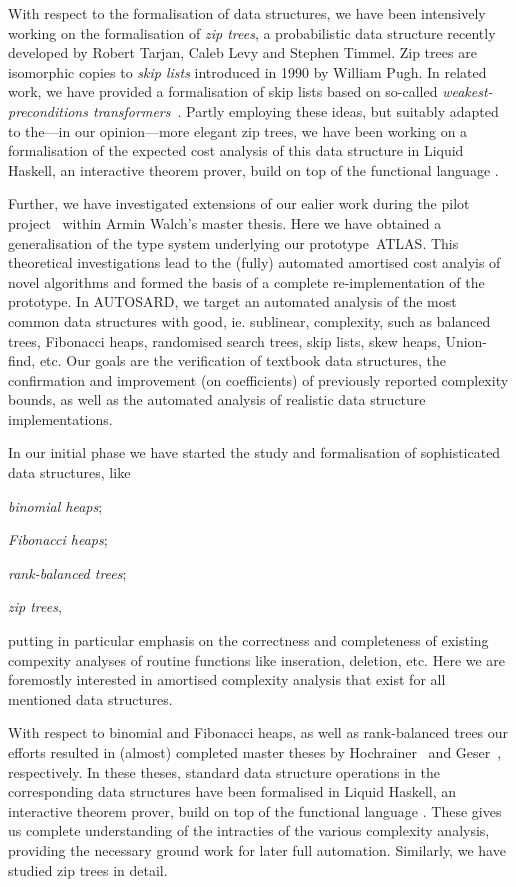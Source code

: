 \documentclass[10pt,a4paper]{article}
\newcommand*{\atlas}{\textsf{ATLAS}}
\begin{document}
With respect to the formalisation of data structures, we have been intensively working
on the formalisation of \emph{zip trees}, a probabilistic data structure recently developed
by Robert Tarjan, Caleb Levy and Stephen Timmel. Zip trees are isomorphic copies to
\emph{skip lists} introduced in 1990 by William Pugh.
%
In related work, we have provided a formalisation of skip lists based on so-called \emph{weakest-preconditions transformers}~\cite{AvanziniBGMV24}. Partly employing these ideas, but suitably adapted
to the---in our opinion---more elegant zip trees, we have been working on
a formalisation of the expected cost analysis of this data structure in Liquid Haskell, an interactive theorem prover, build on top of the functional
language \Haskell.

Further, we have investigated extensions of our ealier work during the pilot project~\cite{LMZ:2021,LMZ:2022} within Armin Walch's master thesis. Here we have obtained a generalisation of the type system
underlying our prototype~\atlas. This theoretical investigations lead to the (fully) automated amortised
cost analyis of novel algorithms and formed the basis of a complete re-implementation of the prototype. 
In AUTOSARD, we target an automated analysis of the most common data structures with good, ie. sublinear, complexity, such as balanced trees, Fibonacci heaps, randomised search trees, skip lists, skew heaps, Union-find, etc. Our goals are the verification of textbook data structures, the confirmation and improvement (on coefficients) of previously reported complexity bounds, as well as the automated analysis of realistic data structure implementations.

In our initial phase we have started the study and formalisation of sophisticated data structures, like
%
\begin{inparaenum}[(i)]
\item \emph{binomial heaps};
\item \emph{Fibonacci heaps};
\item \emph{rank-balanced trees};
\item \emph{zip trees},
\end{inparaenum}
%
putting in particular emphasis on the correctness and completeness of existing compexity analyses of routine functions
like inseration, deletion, etc. Here we are foremostly interested in amortised complexity analysis that exist for all mentioned
data structures.

With respect to binomial and Fibonacci heaps, as well as rank-balanced trees our efforts resulted in (almost) completed master theses by
Hochrainer~\cite{Hochrainer:2024} and Geser~\cite{Geser:2024}, respectively. In these theses, standard data structure operations in
the corresponding data structures have been formalised in Liquid Haskell, an interactive theorem prover, build on top of the functional
language \Haskell. These gives us complete understanding of the intracties of the various complexity analysis, providing the necessary
ground work for later full automation. Similarly, we have studied zip trees in detail.
\end{document}

